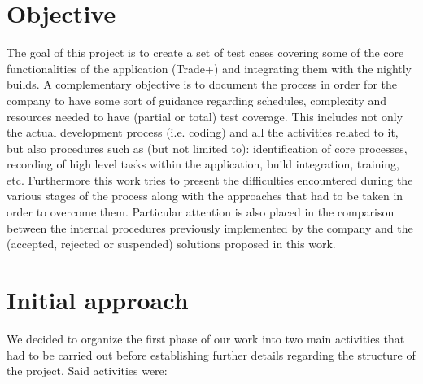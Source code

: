\section{Objective} 

The goal of this project is to create a set of test cases covering some of the core functionalities of the application (Trade+) and integrating them with the nightly builds. A complementary objective is to document the process in order for the company to have some sort of guidance regarding schedules, complexity and resources needed to have (partial or total) test coverage. 
This includes not only the actual development process (i.e. coding) and all the activities related to it, but also procedures such as (but not limited to): identification of core processes, recording of high level tasks within the application, build integration, training, etc. Furthermore this work tries to present the difficulties encountered during the various stages of the process along with the approaches that had to be taken in order to overcome them. Particular attention is also placed in the comparison between the internal procedures previously implemented by the company and the (accepted, rejected or suspended) solutions proposed in this work.

\section{Initial approach}

We decided to organize the first phase of our work into two main activities that had to be carried out before establishing further details regarding the structure of the project. Said activities were:

